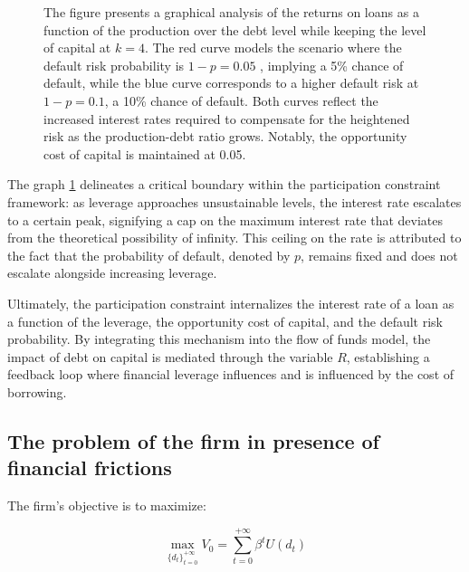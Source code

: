 \documentclass[12pt]{report}
\begin{document}
\begin{figure}
    \caption{The figure presents a graphical analysis of the returns on loans as a function of the production over the
    debt level while keeping the level of capital at
    \(k=4\). The red curve models the scenario where the default risk probability is 
    \(1-p=0.05\)
    , implying a 5\% chance of default, while the blue curve corresponds to a higher default risk at 
    \(1-p=0.1\), a 10\% chance of default. Both curves reflect the increased interest rates required to compensate for
    the heightened risk as the production-debt ratio grows. Notably, the opportunity cost of capital is maintained at 0.05.
    }
    \label{plot:part_constraint_r_fixlavarge}
\end{figure}
The graph \ref{plot:part_constraint_r_fixlavarge} delineates a critical boundary within the participation constraint framework: as leverage approaches
unsustainable levels, the interest rate escalates to a certain peak, signifying a cap on the maximum interest rate that
deviates from the theoretical possibility of infinity. This ceiling on the rate is attributed to the fact that the
probability of default, denoted by \( p \), remains fixed and does not escalate alongside increasing leverage. 

Ultimately, the participation constraint internalizes the interest rate of a loan as a function of the leverage, the
opportunity cost of capital, and the default risk probability. By integrating this mechanism into the flow of funds
model, the impact of debt on capital is mediated through the variable \( R \), establishing a feedback loop where
financial leverage influences and is influenced by the cost of borrowing. 




\subsection{The problem of the firm in presence of financial frictions}
 The firm's objective is to maximize:

\[
\max_{{\{d_{t}\}}_{t=0}^{+\infty}}V_0 = \sum_{t=0}^{+\infty}{\beta^t U(d_t)}
\]
\end{document}
